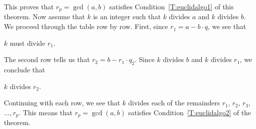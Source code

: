 \begin{myproof}
This proves that  $r_p  = \gcd( {a, b} )$ satisfies Condition~\ref{T:euclidalgo1} of this theorem.  Now assume that  $k$  is an integer such that  $k$  divides  $a$  and  $k$  divides  $b$.  We proceed through the table row by row.  First,  since  $r_1  = a - b \cdot q$, we see that  
\begin{center}
$k$  must divide  $r_1 $.
\end{center}
The second row tells us that  $r_2  = b - r_1  \cdot q_2 $.  Since  $k$  divides  $b$  and  $k$ divides  $r_1 $, we conclude that  
\begin{center}
$k$  divides  $r_2 $.
\end{center}
Continuing with each row, we see that  $k$  divides each of the remainders  
$r_1$, $r_2$, $r_3$, $\ldots, r_p$.  This means that  
$r_p  = \gcd( {a, b} )$ satisfies Condition~\ref{T:euclidalgo2} of the theorem.  
\end{myproof}
%


